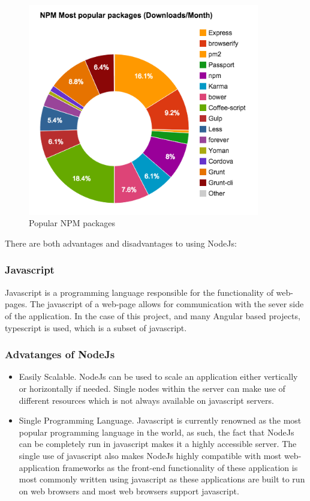 \begin{figure}[h!]
    	\caption{Popular NPM packages}
	\centering
	\includegraphics[width=0.9\textwidth]{images/npm.png}
\end{figure}

There are both advantages and disadvantages to using NodeJs\cite{advdis2}: \\

\subsubsection{Javascript}
Javascript is a programming language responsible for the functionality of web-pages. The javascript of a web-page allows for communication with the sever side of the application. In the case of this project, and many Angular based projects, typescript is used, which is a subset of javascript.

\subsubsection{Advatanges of NodeJs}
\begin{itemize}
    \item Easily Scalable. NodeJs can be used to scale an application either vertically or horizontally if needed. Single nodes within the server can make use of different resources which is not always available on javascript servers.
    \item Single Programming Language. Javascript is currently renowned as the most popular programming language in the world, as such, the fact that NodeJs can be completely run in javascript makes it a highly accessible server. The single use of javascript also makes NodeJs highly compatible with most web-application frameworks as the front-end functionality of these application is most commonly written using javascript as these applications are built to run on web browsers and most web browsers support javascript.
\end{itemize}

